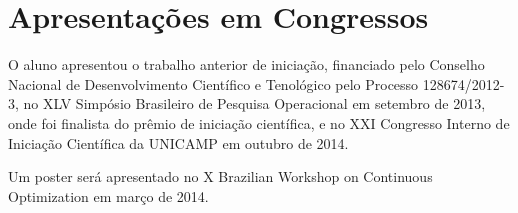 \section{Apresentações em Congressos}
O aluno apresentou o trabalho anterior de iniciação, financiado pelo Conselho
Nacional de Desenvolvimento Científico e Tenológico pelo Processo
128674/2012-3, no XLV Simpósio Brasileiro de Pesquisa Operacional em setembro
de 2013, onde foi finalista do prêmio de iniciação científica, e no XXI
Congresso Interno de Iniciação Científica da UNICAMP em
outubro de 2014.

Um poster será apresentado no X Brazilian Workshop on Continuous Optimization
em março de 2014.
